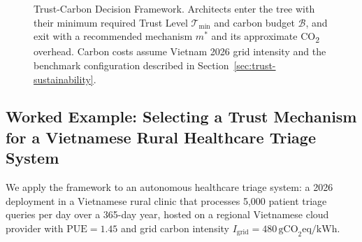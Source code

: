 \begin{figure}[ht]
\caption{Trust-Carbon Decision Framework.
  Architects enter the tree with their minimum required Trust Level
  $\mathcal{T}_{\min}$ and carbon budget $\mathcal{B}$, and exit
  with a recommended mechanism $m^*$ and its approximate
  CO\textsubscript{2} overhead.
  Carbon costs assume Vietnam 2026 grid intensity and the
  benchmark configuration described in
  Section~\ref{sec:trust-sustainability}.}
\label{fig:trust-carbon-decision}
\end{figure}

\subsection{Worked Example: Selecting a Trust Mechanism for a
            Vietnamese Rural Healthcare Triage System}
\label{subsec:carbon-worked-example}

We apply the framework to an autonomous healthcare triage system:
a 2026 deployment in a Vietnamese rural clinic that processes
5{,}000 patient triage queries per day over a 365-day year, hosted
on a regional Vietnamese cloud provider with
$\mathrm{PUE} = 1.45$ and grid carbon intensity
$I_{\mathrm{grid}} = 480\,\text{gCO}_2\text{eq/kWh}$.

